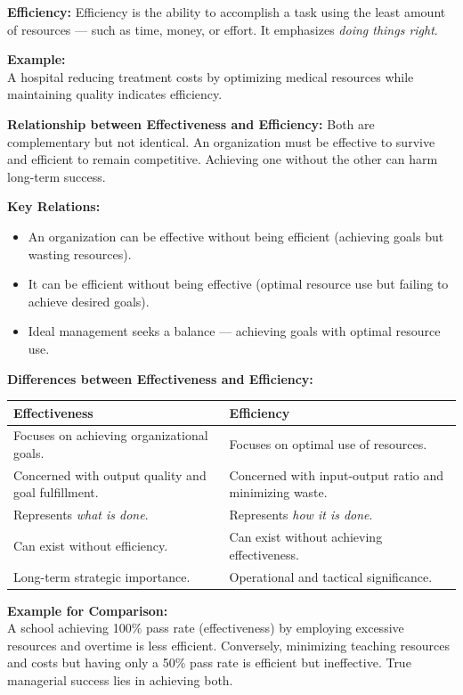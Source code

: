 \documentclass[12pt,a4paper]{book}
\begin{document}
\textbf{Efficiency:}
Efficiency is the ability to accomplish a task using the least amount of resources — such as time, money, or effort. It emphasizes \textit{doing things right}.

\textbf{Example:}\\
A hospital reducing treatment costs by optimizing medical resources while maintaining quality indicates efficiency.

\textbf{Relationship between Effectiveness and Efficiency:}
Both are complementary but not identical. An organization must be effective to survive and efficient to remain competitive. Achieving one without the other can harm long-term success.

\textbf{Key Relations:}
\begin{itemize}
    \item An organization can be effective without being efficient (achieving goals but wasting resources).
    \item It can be efficient without being effective (optimal resource use but failing to achieve desired goals).
    \item Ideal management seeks a balance — achieving goals with optimal resource use.
\end{itemize}

\textbf{Differences between Effectiveness and Efficiency:}

\begin{tabular}{|p{8cm}|p{8cm}|}
\hline
\textbf{Effectiveness} & \textbf{Efficiency} \\
\hline
Focuses on achieving organizational goals. & Focuses on optimal use of resources. \\
\hline
Concerned with output quality and goal fulfillment. & Concerned with input-output ratio and minimizing waste. \\
\hline
Represents \textit{what is done}. & Represents \textit{how it is done}. \\
\hline
Can exist without efficiency. & Can exist without achieving effectiveness. \\
\hline
Long-term strategic importance. & Operational and tactical significance. \\
\hline
\end{tabular}

\vspace{0.5cm}

\textbf{Example for Comparison:}\\
A school achieving 100\% pass rate (effectiveness) by employing excessive resources and overtime is less efficient. Conversely, minimizing teaching resources and costs but having only a 50\% pass rate is efficient but ineffective. True managerial success lies in achieving both.
\end{document}
